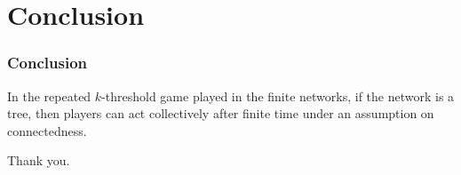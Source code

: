 \documentclass[8pt]{beamer}
\begin{document}
\section{Conclusion}
\begin{frame}

\frametitle{Conclusion}



In the repeated $k$-threshold game played in the finite networks, if the network is a tree, then players can act collectively after finite time under an assumption on connectedness.

\end{frame}


\begin{frame}

Thank you.
\end{frame}
\end{document}
